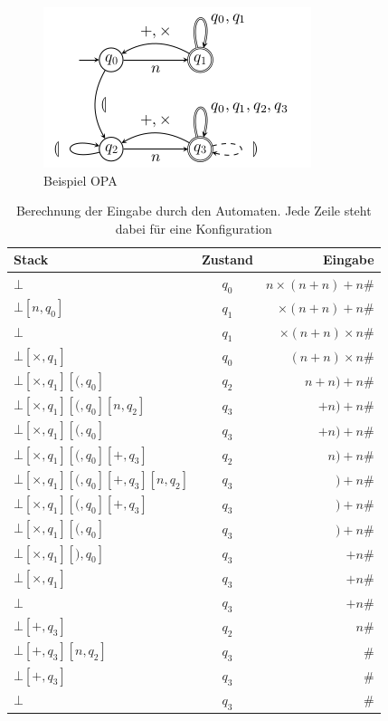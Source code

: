 \begin{figure}\centering
\includegraphics[scale=0.8]{sections/bsp_opa}
\caption{Beispiel OPA}
\label{bsp_opa}
\end{figure}
\begin{table}
\begin{tabular}{|l | c | r |}
\hline
Stack & Zustand & Eingabe \\
\hline \hline
$\bot$ & $q_0$ & $n \times (n+n) + n \#$ \\ \hline
$\bot \left[n, q_0 \right]$ & $q_1$ & $\times  (n+n) + n \#$\\ \hline
$\bot $ & $q_1$ & $\times (n+n) \times n \#$ \\ \hline
$\bot \left[\times, q_1 \right] $ & $q_0$ & $ (n+n) \times n \#$ \\ \hline
$\bot \left[\times, q_1 \right] \left[(, q_0 \right] $ & $q_2$ & $ n+n) + n \#$ \\ \hline
$\bot \left[\times, q_1 \right] \left[(, q_0 \right]\left[n, q_2 \right] $ & $q_3$ & $ +n) +n \#$ \\ \hline
$\bot \left[\times, q_1 \right] \left[(, q_0 \right] $ & $q_3$ & $ +n) + n \#$ \\ \hline
$\bot \left[\times, q_1 \right] \left[(, q_0 \right]\left[+, q_3 \right] $ & $q_2$ & $ n) + n \#$ \\ \hline
$\bot \left[\times, q_1 \right] \left[(, q_0 \right]\left[+, q_3 \right]\left[n, q_2 \right] $ & $q_3$ & $ ) + n \#$ \\ \hline
$\bot \left[\times, q_1 \right] \left[(, q_0 \right]\left[+, q_3 \right] $ & $q_3$ & $ ) +n \#$ \\ \hline
$\bot \left[\times, q_1 \right] \left[(, q_0 \right]$ & $q_3$ & $ ) + n \#$ \\ \hline
$\bot \left[\times, q_1 \right] \left[), q_0 \right]$ & $q_3$ & $  + n \#$ \\ \hline
$\bot \left[\times, q_1 \right]$ & $q_3$ & $  + n \#$ \\ \hline
$\bot $ & $q_3$ & $ + n \#$ \\ \hline
$\bot \left[+, q_3 \right]$ & $q_2$ & $ n \#$ \\ \hline
$\bot \left[+, q_3 \right] \left[n, q_2 \right]$ & $q_3$ & $\#$ \\ \hline
$\bot \left[+, q_3 \right]$ & $q_3$ & $\#$ \\ \hline
$\bot $ & $q_3$ & $\#$ \\ \hline
\end{tabular}
\caption{Berechnung der Eingabe durch den Automaten. Jede Zeile steht dabei für eine Konfiguration}
\label{compute}
\end{table}


